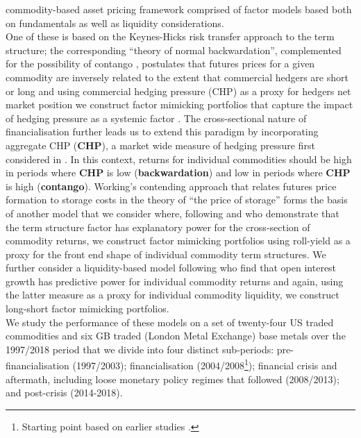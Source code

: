 \documentclass[
  authoryear,
  preprint,
  3p]{elsarticle}
\begin{document}
commodity-based asset pricing framework comprised of factor models based
both on fundamentals as well as liquidity considerations.\\
One of these is based on the Keynes-Hicks
\citep{keynes_some_1923, keynes_treatise_1930, hicks_value_1939, hicks_value_1946}
risk transfer approach to the term structure; the corresponding ``theory
of normal backwardation'', complemented for the possibility of contango
\citep{houthakker_restatement_1957, cootner_returns_1960}, postulates
that futures prices for a given commodity are inversely related to the
extent that commercial hedgers are short or long and using commercial
hedging pressure (CHP) as a proxy for hedgers net market position we
construct factor mimicking portfolios that capture the impact of hedging
pressure as a systemic factor \citep{basu_capturing_2013}. The
cross-sectional nature of financialisation
\citep{cheng_financialisation_2014, basak_model_2016} further leads us
to extend this paradigm by incorporating aggregate CHP (\textbf{CHP}), a
market wide measure of hedging pressure first considered in
\citet{hong_what_2012}. In this context, returns for individual
commodities should be high in periods where \textbf{CHP} is low
(\textbf{backwardation}) and low in periods where \textbf{CHP} is high
(\textbf{contango}). Working's contending approach that relates futures
price formation to storage costs in the theory of ``the price of
storage'' \citep{working_theory_1949} forms the basis of another model
that we consider where, following \citet{szymanowska_anatomy_2014} and
\citet{fuertes_commodity_2015} who demonstrate that the term structure
factor has explanatory power for the cross-section of commodity returns,
we construct factor mimicking portfolios using roll-yield as a proxy for
the front end shape of individual commodity term structures. We further
consider a liquidity-based model following \citet{hong_what_2012} who
find that open interest growth has predictive power for individual
commodity returns and again, using the latter measure as a proxy for
individual commodity liquidity, we construct long-short factor mimicking
portfolios.\\
We study the performance of these models on a set of twenty-four US
traded commodities and six GB traded (London Metal Exchange) base metals
over the 1997/2018 period that we divide into four distinct sub-periods:
pre-financialisation (1997/2003); financialisation
(2004/2008\footnote{Starting point based on earlier studies
  \citep{baker_financialization_2021, christoffersen_factor_2014}.});
financial crisis and aftermath, including loose monetary policy regimes
that followed (2008/2013); and post-crisis (2014-2018).
\end{document}
